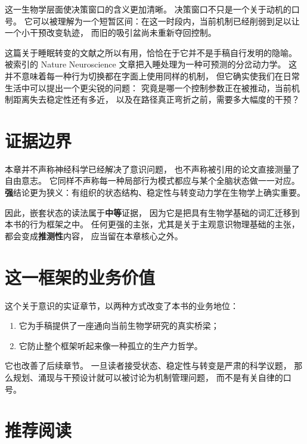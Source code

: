 这一生物学层面使决策窗口的含义更加清晰。
决策窗口不只是一个关于动机的口号。
它可以被理解为一个短暂区间：在这一时段内，当前机制已经削弱到足以让一个小干预改变轨迹，
而旧的吸引盆尚未重新夺回控制。

\begin{example}[把入睡视为一种转变模型]
这篇关于睡眠转变的文献之所以有用，恰恰在于它并不是手稿自行发明的隐喻。
被索引的 Nature Neuroscience 文章把入睡处理为一种可预测的分岔动力学。
这并不意味着每一种行为切换都在字面上使用同样的机制，
但它确实使我们在日常生活中可以提出一个更尖锐的问题：
究竟是哪一个控制参数正在被推动，当前机制距离失去稳定性还有多近，
以及在路径真正弯折之前，需要多大幅度的干预？
\end{example}

\section{证据边界}

本章并不声称神经科学已经解决了意识问题，
也不声称被引用的论文直接测量了自由意志。
它同样不声称每一种局部行为模式都应与某个全脑状态做一一对应。
\textbf{强}结论更为狭义：有组织的状态结构、稳定性与转变动力学在生物学上确实重要。

因此，嵌套状态的读法属于\textbf{中等}证据，
因为它是把具有生物学基础的词汇迁移到本书的行为框架之中。
任何更强的主张，尤其是关于主观意识物理基础的主张，都会变成\textbf{推测性}内容，
应当留在本章核心之外。

\section{这一框架的业务价值}

这个关于意识的实证章节，以两种方式改变了本书的业务地位：
\begin{enumerate}[nosep]
  \item 它为手稿提供了一座通向当前生物学研究的真实桥梁；
  \item 它防止整个框架听起来像一种孤立的生产力哲学。
\end{enumerate}

它也改善了后续章节。
一旦读者接受状态、稳定性与转变是严肃的科学议题，
那么规划、涌现与干预设计就可以被讨论为机制管理问题，
而不是有关自律的口号。

\section{推荐阅读}


